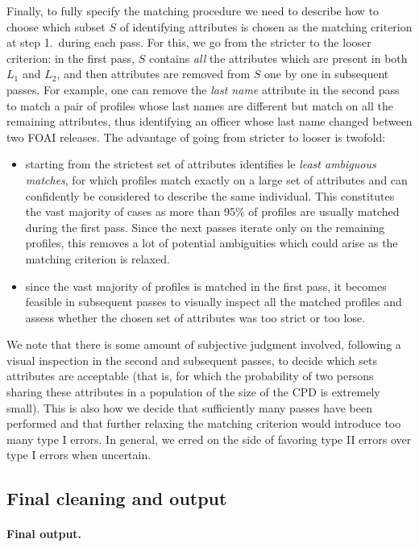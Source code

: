 Finally, to fully specify the matching procedure we need to describe how to
choose which subset $S$ of identifying attributes is chosen as the matching
criterion at step 1.\ during each pass. For this, we go from the stricter to
the looser criterion: in the first pass, $S$ contains \emph{all} the attributes
which are present in both $L_1$ and $L_2$, and then attributes are removed from
$S$ one by one in subsequent passes. For example, one can remove the \emph{last
name} attribute in the second pass to match a pair of profiles whose last names
are different but match on all the remaining attributes, thus identifying an
officer whose last name changed between two FOAI releases. The advantage of
going from stricter to looser is twofold:
\begin{itemize}
	\item starting from the strictest set of attributes identifies le
		\emph{least ambiguous matches}, for which profiles match exactly on
		a large set of attributes and can confidently be considered to describe
		the same individual. This constitutes the vast majority of cases as
		more than 95\% of profiles are usually matched during the first pass.
		Since the next passes iterate only on the remaining profiles, this
		removes a lot of potential ambiguities which could arise as the
		matching criterion is relaxed.
	\item since the vast majority of profiles is matched in the first pass,
		it becomes feasible in subsequent passes to visually inspect all
		the matched profiles and assess whether the chosen set of attributes was
		too strict or too lose.
\end{itemize}

We note that there is some amount of subjective judgment involved, following
a visual inspection in the second and subsequent passes, to decide which sets
attributes are acceptable (that is, for which the probability of two persons
sharing these attributes in a population of the size of the CPD is extremely
small). This is also how we decide that sufficiently many passes have been
performed and that further relaxing the matching criterion would introduce too
many type I errors. In general, we erred on the side of favoring
type II errors over type I errors when uncertain.




\subsection{Final cleaning and output}




\paragraph{Final output.}
